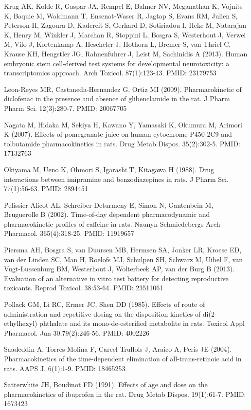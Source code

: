 \documentclass[a4paper]{book}
\begin{document}
\begin{References}
Krug AK, Kolde R, Gaspar JA, Rempel E, Balmer NV, Meganathan K, Vojnits K,
Baquie M, Waldmann T, Ensenat-Waser R, Jagtap S, Evans RM, Julien S,
Peterson H, Zagoura D, Kadereit S, Gerhard D, Sotiriadou I, Heke M,
Natarajan K, Henry M, Winkler J, Marchan R, Stoppini L, Bosgra S, Westerhout
J, Verwei M, Vilo J, Kortenkamp A, Hescheler J, Hothorn L, Bremer S, van
Thriel C, Krause KH, Hengstler JG, Rahnenfuhrer J, Leist M, Sachinidis A
(2013). Human embryonic stem cell-derived test systems for developmental
neurotoxicity: a transcriptomics approach. Arch Toxicol. 87(1):123-43. PMID:
23179753

Leon-Reyes MR, Castaneda-Hernandez G, Ortiz MI (2009). Pharmacokinetic of
diclofenac in the presence and absence of glibenclamide in the rat. J Pharm
Pharm Sci. 12(3):280-7. PMID: 20067705

Nagata M, Hidaka M, Sekiya H, Kawano Y, Yamasaki K, Okumura M, Arimori K
(2007). Effects of pomegranate juice on human cytochrome P450 2C9 and
tolbutamide pharmacokinetics in rats. Drug Metab Dispos. 35(2):302-5. PMID:
17132763

Okiyama M, Ueno K, Ohmori S, Igarashi T, Kitagawa H (1988). Drug
interactions between imipramine and benzodiazepines in rats. J Pharm Sci.
77(1):56-63. PMID: 2894451

Pelissier-Alicot AL, Schreiber-Deturmeny E, Simon N, Gantenbein M,
Bruguerolle B (2002). Time-of-day dependent pharmacodynamic and
pharmacokinetic profiles of caffeine in rats. Naunyn Schmiedebergs Arch
Pharmacol. 365(4):318-25. PMID: 11919657

Piersma AH, Bosgra S, van Duursen MB, Hermsen SA, Jonker LR, Kroese ED, van
der Linden SC, Man H, Roelofs MJ, Schulpen SH, Schwarz M, Uibel F, van
Vugt-Lussenburg BM, Westerhout J, Wolterbeek AP, van der Burg B (2013).
Evaluation of an alternative in vitro test battery for detecting
reproductive toxicants. Reprod Toxicol. 38:53-64. PMID: 23511061

Pollack GM, Li RC, Ermer JC, Shen DD (1985). Effects of route of
administration and repetitive dosing on the disposition kinetics of
di(2-ethylhexyl) phthalate and its mono-de-esterified metabolite in rats.
Toxicol Appl Pharmacol. Jun 30;79(2):246-56. PMID: 4002226

Saadeddin A, Torres-Molina F, Carcel-Trullols J, Araico A, Peris JE (2004).
Pharmacokinetics of the time-dependent elimination of all-trans-retinoic
acid in rats. AAPS J. 6(1):1-9. PMID: 18465253

Satterwhite JH, Boudinot FD (1991). Effects of age and dose on the
pharmacokinetics of ibuprofen in the rat. Drug Metab Dispos. 19(1):61-7.
PMID: 1673423


\end{References}
\end{document}
